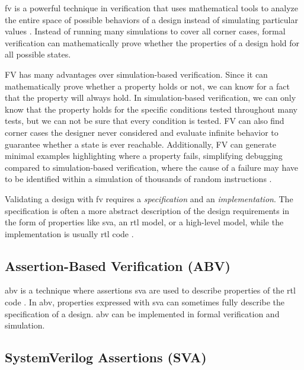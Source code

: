 \acrfull{fv} is a powerful technique in verification that uses mathematical tools to analyze the entire space of possible behaviors of a design instead of simulating particular values \cite{seligmanFormalVerificationEssential2015}. Instead of running many simulations to cover all corner cases, formal verification can mathematically prove whether the properties of a design hold for all possible states.

FV has many advantages over simulation-based verification. Since it can mathematically prove whether a property holds or not, we can know for a fact that the property will always hold. In simulation-based verification, we can only know that the property holds for the specific conditions tested throughout many tests, but we can not be sure that every condition is tested. FV can also find corner cases the designer never considered and evaluate infinite behavior to guarantee whether a state is ever reachable.
Additionally, FV can generate minimal examples highlighting where a property fails, simplifying debugging compared to simulation-based verification, where the cause of a failure may have to be identified within a simulation of thousands of random instructions \cite{seligmanFormalVerificationEssential2015}.

Validating a design with \acrshort{fv} requires a \textit{specification} and an \textit{implementation}. The specification is often a more abstract description of the design requirements in the form of properties like \acrfull{sva}, an \acrshort{rtl} model, or a high-level model, while the implementation is usually \acrshort{rtl} code \cite{seligmanFormalVerificationEssential2015}. 


\subsection{Assertion-Based Verification (ABV)}

\acrfull{abv} is a technique where assertions \acrfull{sva} are used to describe properties of the \acrshort{rtl} code \cite{seligmanFormalVerificationEssential2015}. In \acrshort{abv}, properties expressed with \acrshort{sva} can sometimes fully describe the specification of a design. \acrshort{abv} can be implemented in formal verification and simulation.

\subsection{SystemVerilog Assertions (SVA)}


